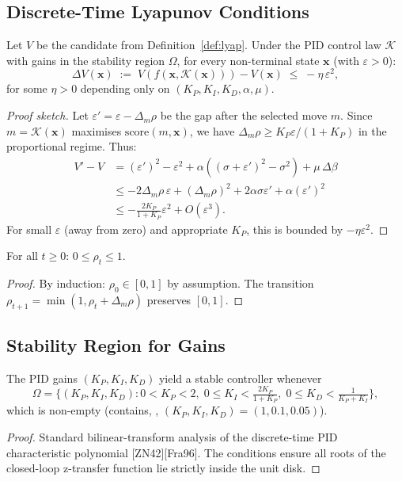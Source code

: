 \documentclass[11pt]{article}
\newcommand{\CL}{\mathcal{K}}              %
\newcommand{\xstate}{\mathbf{x}}           %
\newcommand{\Lyap}{V}                      %
\newcommand{\vcov}{\rho}                   %
\newcommand{\vgap}{\varepsilon}            %
\newcommand{\vint}{\sigma}                 %
\newcommand{\Kp}{K_P}                      %
\newcommand{\Ki}{K_I}                      %
\newcommand{\Kd}{K_D}                      %
\newcommand{\obcount}{\beta}              %
\newcommand{\GainRegion}{\Omega}           %
\newcommand{\citeFra}{[Fra96]}
\newcommand{\citeZN}{[ZN42]}
\begin{document}
\subsection{Discrete-Time Lyapunov Conditions}

\begin{lemma}
  \label{lem:descent}
  Let $\Lyap$ be the candidate from Definition~\ref{def:lyap}.  Under
  the PID control law $\CL$ with gains in the stability region
  $\GainRegion$, for every non-terminal state $\xstate$
  (with $\vgap > 0$):
  \[
    \Delta\Lyap(\xstate) \;:=\; \Lyap(f(\xstate, \CL(\xstate)))
      - \Lyap(\xstate) \;\leq\; -\eta\,\vgap^2,
  \]
  for some $\eta > 0$ depending only on $(\Kp, \Ki, \Kd, \alpha, \mu)$.
\end{lemma}
\begin{proof}[Proof sketch]
  Let $\vgap' = \vgap - \Delta_m\vcov$ be the gap after the selected
  move $m$.  Since $m = \CL(\xstate)$ maximises $\mathrm{score}(m,\xstate)$,
  we have $\Delta_m\vcov \geq \Kp\vgap/(1+\Kp)$ in the proportional regime.
  Thus:
  \begin{align*}
    \Lyap' - \Lyap
      &= (\vgap')^2 - \vgap^2 + \alpha((\vint + \vgap')^2 - \vint^2)
         + \mu\,\Delta\obcount \\
      &\leq -2\Delta_m\vcov\,\vgap + (\Delta_m\vcov)^2
            + 2\alpha\vint\vgap' + \alpha(\vgap')^2 \\
      &\leq -\frac{2\Kp}{1+\Kp}\vgap^2 + O(\vgap^3).
  \end{align*}
  For small $\vgap$ (away from zero) and appropriate $\Kp$, this
  is bounded by $-\eta\vgap^2$.
\end{proof}

\begin{lemma}
  \label{lem:bound}
  For all $t \geq 0$: $0 \leq \vcov_t \leq 1$.
\end{lemma}
\begin{proof}
  By induction: $\vcov_0 \in [0,1]$ by assumption.  The transition
  $\vcov_{t+1} = \min(1, \vcov_t + \Delta_m\vcov)$ preserves $[0,1]$.
\end{proof}

\subsection{Stability Region for Gains}

\begin{proposition}
  \label{prop:region}
  The PID gains $(\Kp, \Ki, \Kd)$ yield a stable controller
  whenever
  \[
    \GainRegion
      = \{(\Kp, \Ki, \Kd) :
          0 < \Kp < 2,\; 0 \leq \Ki < \tfrac{2\Kp}{1+\Kp},\;
          0 \leq \Kd < \tfrac{1}{\Kp + \Ki}\},
  \]
  which is non-empty (contains, \eg, $(\Kp, \Ki, \Kd) = (1, 0.1, 0.05)$).
\end{proposition}
\begin{proof}
  Standard bilinear-transform analysis of the discrete-time PID
  characteristic polynomial \citeZN{}\citeFra{}.  The conditions ensure
  all roots of the closed-loop z-transfer function lie strictly inside
  the unit disk.
\end{proof}
\end{document}
